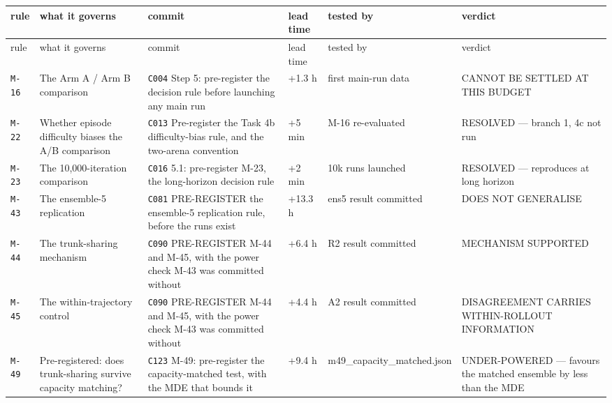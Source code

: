 \documentclass[10pt]{article}
\begin{document}
\begingroup\footnotesize\setlength{\tabcolsep}{3pt}
\begin{longtable}{>{\raggedright\arraybackslash}p{}>{\raggedright\arraybackslash}p{}>{\raggedright\arraybackslash}p{}>{\raggedright\arraybackslash}p{}>{\raggedright\arraybackslash}p{}>{\raggedright\arraybackslash}p{}}
\toprule rule & what it governs & commit & lead time & tested by & verdict \\ \midrule\endfirsthead
\toprule rule & what it governs & commit & lead time & tested by & verdict \\ \midrule\endhead
\bottomrule\endlastfoot
\texttt{M-16} & The Arm A /\allowbreak{} Arm B comparison & \texttt{C004} Step 5: pre-register the decision rule before launching any main run & +1.3 h & first main-run data & CANNOT BE SETTLED AT THIS BUDGET \\
\texttt{M-22} & Whether episode difficulty biases the A/\allowbreak{}B comparison & \texttt{C013} Pre-register the Task 4b difficulty-bias rule, and the two-arena convention & +5 min & M-16 re-evaluated & RESOLVED --- branch 1, 4c not run \\
\texttt{M-23} & The 10,000-iteration comparison & \texttt{C016} 5.1: pre-register M-23, the long-horizon decision rule & +2 min & 10k runs launched & RESOLVED --- reproduces at long horizon \\
\texttt{M-43} & The ensemble-5 replication & \texttt{C081} PRE-REGISTER the ensemble-5 replication rule, before the runs exist & +13.3 h & ens5 result committed & DOES NOT GENERALISE \\
\texttt{M-44} & The trunk-sharing mechanism & \texttt{C090} PRE-REGISTER M-44 and M-45, with the power check M-43 was committed without & +6.4 h & R2 result committed & MECHANISM SUPPORTED \\
\texttt{M-45} & The within-trajectory control & \texttt{C090} PRE-REGISTER M-44 and M-45, with the power check M-43 was committed without & +4.4 h & A2 result committed & DISAGREEMENT CARRIES WITHIN-ROLLOUT INFORMATION \\
\texttt{M-49} & Pre-registered: does trunk-sharing survive capacity matching? & \texttt{C123} M-49: pre-register the capacity-matched test, with the MDE that bounds it & +9.4 h & m49\_\allowbreak{}capacity\_\allowbreak{}matched\allowbreak{}.json & UNDER-POWERED --- favours the matched ensemble by less than the MDE \\

\end{longtable}
\end{document}
